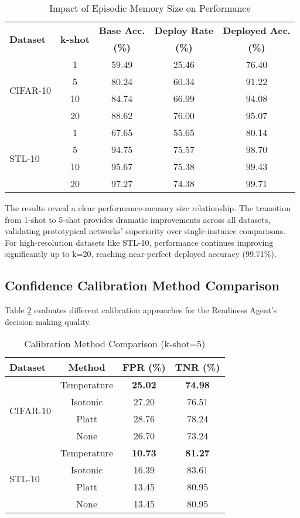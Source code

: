 \documentclass[conference]{IEEEtran}
\begin{document}
\begin{table}[h]
\centering
\caption{Impact of Episodic Memory Size on Performance}
\label{tab:memory_analysis}
\small
\begin{tabular}{lcccc}
\toprule
\multirow{2}{*}{\textbf{Dataset}} & \multirow{2}{*}{\textbf{k-shot}} & \textbf{Base Acc.} & \textbf{Deploy Rate} & \textbf{Deployed Acc.} \\
& & \textbf{(\%)} & \textbf{(\%)} & \textbf{(\%)} \\
\midrule
\multirow{4}{*}{CIFAR-10} & 1 & 59.49 & 25.46 & 76.40 \\
& 5 & 80.24 & 60.34 & 91.22 \\
& 10 & 84.74 & 66.99 & 94.08 \\
& 20 & 88.62 & 76.00 & 95.07 \\
\midrule
\multirow{4}{*}{STL-10} & 1 & 67.65 & 55.65 & 80.14 \\
& 5 & 94.75 & 75.57 & 98.70 \\
& 10 & 95.67 & 75.38 & 99.43 \\
& 20 & 97.27 & 74.38 & 99.71 \\
\bottomrule
\end{tabular}
\end{table}

The results reveal a clear performance-memory size relationship. The transition from 1-shot to 5-shot provides dramatic improvements across all datasets, validating prototypical networks' superiority over single-instance comparisons. For high-resolution datasets like STL-10, performance continues improving significantly up to k=20, reaching near-perfect deployed accuracy (99.71\%).

\subsection{Confidence Calibration Method Comparison}

Table \ref{tab:calibration} evaluates different calibration approaches for the Readiness Agent's decision-making quality.

\begin{table}[h]
\centering
\caption{Calibration Method Comparison (k-shot=5)}
\label{tab:calibration}
\begin{tabular}{lccc}
\toprule
\textbf{Dataset} & \textbf{Method} & \textbf{FPR (\%)} & \textbf{TNR (\%)} \\
\midrule
\multirow{4}{*}{CIFAR-10} & Temperature & \textbf{25.02} & \textbf{74.98} \\
& Isotonic & 27.20 & 76.51 \\
& Platt & 28.76 & 78.24 \\
& None & 26.70 & 73.24 \\
\midrule
\multirow{4}{*}{STL-10} & Temperature & \textbf{10.73} & \textbf{81.27} \\
& Isotonic & 16.39 & 83.61 \\
& Platt & 13.45 & 80.95 \\
& None & 13.45 & 80.95 \\
\bottomrule
\end{tabular}
\end{table}
\end{document}
